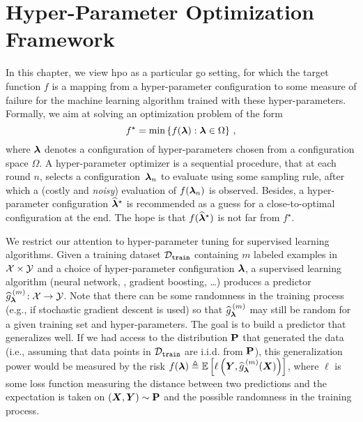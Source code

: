 \section{Hyper-Parameter Optimization Framework}\label{sec:dttts.framework}

In this chapter, we view \gls{hpo} as a particular \gls{go} setting, for which the target function $f$ is a mapping from a hyper-parameter configuration to some measure of failure for the machine learning algorithm trained with these hyper-parameters. Formally, we aim at solving an optimization problem of the form 
\[
f^\star = \min \left\{f({\boldsymbol \lambda}):{\boldsymbol \lambda}\in\Omega\right\}\,,
\]
where ${\boldsymbol \lambda}$ denotes a configuration of hyper-parameters chosen from a configuration space $\Omega$. A hyper-parameter optimizer is a sequential procedure, that at each round $n$, selects a configuration~${\boldsymbol \lambda}_n$ to evaluate using some sampling rule, after which a (costly and \emph{noisy}) evaluation of $f({\boldsymbol \lambda}_n)$ is observed. Besides, a hyper-parameter configuration $\widehat{{\boldsymbol \lambda}}^\star$ is recommended as a guess for a close-to-optimal configuration at the end. The hope is that $f(\widehat{{\boldsymbol \lambda}}^\star)$ is not far from $f^\star$.

We restrict our attention to hyper-parameter tuning for supervised learning algorithms. Given a training dataset $\mathcal{D}_{\texttt{train}}$ containing $m$ labeled examples in $\mathcal{X} \times \mathcal{Y}$ and a choice of hyper-parameter configuration ${\boldsymbol \lambda}$, a supervised learning algorithm (neural network, \SVM, gradient boosting, \dots) produces a predictor $\widehat{g}_{\bm\lambda}^{\,(m)}\!:\mathcal{X} \rightarrow \mathcal{Y}$. Note that there can be some randomness in the training process (e.g., if stochastic gradient descent is used) so that $\widehat{g}_{{\boldsymbol \lambda}}^{\,(m)}$ may still be random for a given training set and hyper-parameters. The goal is to build a predictor that generalizes well. If we had access to the distribution ${\bf P}$ that generated the data (i.e., assuming that data points in $\mathcal{D}_{\texttt{train}}$ are i.i.d. from ${\bf P}$), this generalization power would be measured by the risk $f(\bm\lambda) \triangleq \mathbb{E}\left[\ell\left(\bm Y,\widehat g_{{\boldsymbol \lambda}}^{\,(m)}(\bm X)\right) \right]$, where $\ell$ is some loss function measuring the distance between two predictions and the expectation is taken on $(\bm X , \bm Y) \sim {\bf P}$ and the possible randomness in the training process. 


